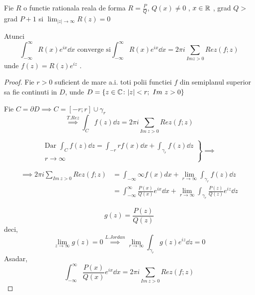 \begin{tip}
    Fie $R$ o functie rationala reala de forma
             $\displaystyle R = \frac{P}{Q}$,
             $Q(x) \neq 0$ ,
             $ x \in \mathbb{R}$ ,
             grad $Q >$ grad  $P+1$ si
             $\displaystyle \lim_{|z|\to\infty} R(z) = 0  $

             Atunci
             \[
                    \int_{- \infty}^{\infty} R(x) e^{ix} \dd x \text{ converge si}
                    \int_{- \infty}^{\infty} R(x) e^{ix} \dd x = 2 \pi i \sum_{Im z >0} Rez(f;z)
              \]
            unde $f(z) = R(z) e^{iz}$ .

    \begin{proof}
        Fie $r>0$ suficient de mare a.i. toti polii functiei $f$ din semiplanul superior
        sa fie continuti in $D$, unde $D=\{z\in\mathbb{C} \colon |z| < r ;\ Im\ z >0\}$

        Fie $C = \partial D \implies C = [-r;r] \cup \gamma_r$
        \[
            \overset{T.Rez}{\implies} \int_{C} f(z) \dd z = 2 \pi i \sum_{Im\ z >0} Rez(f;z)
        \]

        \begin{displaymath}
            \left.
                \begin{aligned}
                    \text{Dar } \int_{C} f(z) \dd z
                        = \int_{-r}{r} f(x) \dd x + \int_{\gamma_r} f(z) \dd z \\
                        r \to \infty
                \end{aligned}
            \right \}
            \implies
        \end{displaymath}

        \begin{align*}
            \implies 2\pi i \sum_{Im\ z >0 } Rez(f;z)
                &= \int_{-\infty}{\infty} f(x) dx + \lim_{r\to\infty} \int_{\gamma_r} f(z) \dd z
            \\
                &= \int_{-\infty}^{\infty} \frac{P(x)}{Q(x)} e^{ix} \dd x
                   + \lim_{r\to\infty} \int_{\gamma_r} \frac{P(z)}{Q(z)} e^{iz} \dd z
        \end{align*}

        \[
            g(z) = \frac{P(z)}{Q(z)}
        \]
        deci,
        \[
            \lim_{z\to\infty}g(z) = 0 \overset{L.Jordan}{\implies}
            \lim_{r\to\infty} \int_{\gamma_r} g(z) e^{iz} \dd z = 0
        \]
        Asadar,
        \[
            \int_{-\infty}^{\infty} \frac{P(x)}{Q(x)} e^{ix} \dd x
                =2 \pi i \sum_{Im\ z >0} Rez(f;z)
        \]
    \end{proof}
\end{tip}

